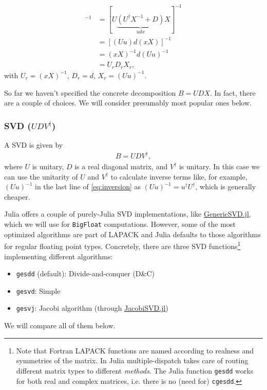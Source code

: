 \documentclass[%
 reprint,
superscriptaddress,
showpacs,
 amsmath,amssymb,
 aps,
 prb,
longbibliography,
]{revtex4-1}
\begin{document}
\begin{align}
[1 + UDX]^{-1} &= [U\underbrace{(U^\dagger X^{-1} + D)}_{udx}X]^{-1} \nonumber\\
&= [(Uu)d(xX)]^{-1} \label{eq:inversion}\\
&= (xX)^{-1} d (Uu)^{-1}\nonumber\\
&= U_r D_r X_r \nonumber,
\end{align}
with $U_r = (xX)^{-1}$, $D_r = d$, $X_r = (Uu)^{-1}$. \nonumber

So far we haven't specified the concrete decomposition $B = UDX$. In fact, there are a couple of choices. We will consider presumably most popular ones below.

\subsubsection{SVD ($UDV^\dagger$)}
A SVD is given by
\begin{align}
	B = UDV^\dagger,
\end{align}
where $U$ is unitary, $D$ is a real diagonal matrix, and $V^\dagger$ is unitary. In this case we can use the unitarity of $U$ and $V^\dagger$ to calculate inverse terms like, for example, $(Uu)^{-1}$ in the last line of \ref{eq:inversion} as $(Uu)^{-1} = u^\dagger U^\dagger$, which is generally cheaper.

Julia offers a couple of purely-Julia SVD implementations, like \href{https://github.com/JuliaLinearAlgebra/GenericSVD.jl/}{GenericSVD.jl}, which we will use for \texttt{BigFloat} computations. However, some of the most optimized algorithms are part of LAPACK\cite{LAPACK} and Julia defaults to those algorithms for regular floating point types. Concretely, there are three SVD functions\footnote{Note that Fortran LAPACK functions are named according to realness and symmetries of the matrix. In Julia multiple-dispatch takes care of routing different matrix types to different \textit{methods}. The Julia function \texttt{gesdd} works for both real and complex matrices, i.e. there is no (need for) \texttt{cgesdd}.} implementing different algorithms:
\begin{itemize}
	\item \texttt{gesdd} (default): Divide-and-conquer (D\&C)
	\item \texttt{gesvd}: Simple
	\item \texttt{gesvj}: Jacobi algorithm (through \href{https://github.com/RalphAS/JacobiSVD.jl}{JacobiSVD.jl})
\end{itemize}
We will compare all of them below.
\end{document}
